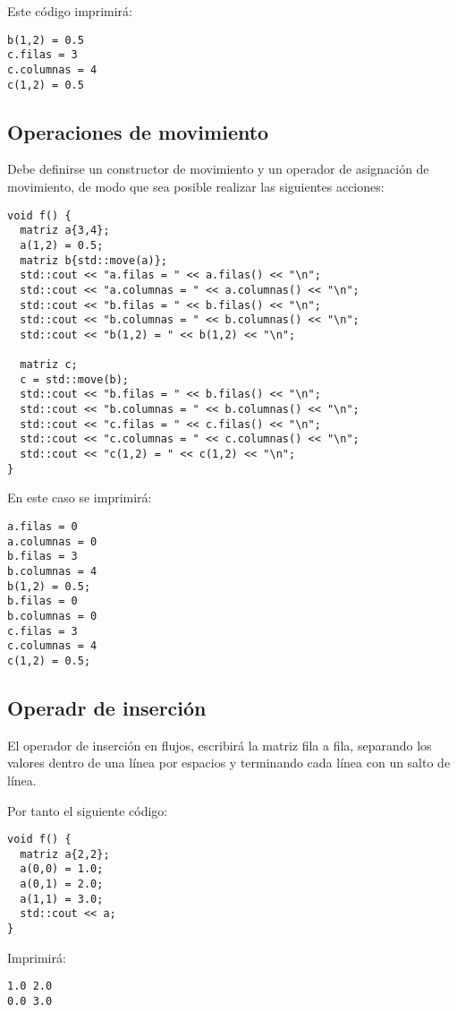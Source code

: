 Este código imprimirá:

\begin{lstlisting}[style=terminal]
b(1,2) = 0.5
c.filas = 3
c.columnas = 4
c(1,2) = 0.5
\end{lstlisting}

\subsection{Operaciones de movimiento}

Debe definirse un constructor de movimiento y un operador de asignación de
movimiento, de modo que sea posible realizar las siguientes acciones:

\begin{lstlisting}
void f() {
  matriz a{3,4};
  a(1,2) = 0.5;
  matriz b{std::move(a)};
  std::cout << "a.filas = " << a.filas() << "\n";
  std::cout << "a.columnas = " << a.columnas() << "\n";
  std::cout << "b.filas = " << b.filas() << "\n";
  std::cout << "b.columnas = " << b.columnas() << "\n";
  std::cout << "b(1,2) = " << b(1,2) << "\n";

  matriz c;
  c = std::move(b);
  std::cout << "b.filas = " << b.filas() << "\n";
  std::cout << "b.columnas = " << b.columnas() << "\n";
  std::cout << "c.filas = " << c.filas() << "\n";
  std::cout << "c.columnas = " << c.columnas() << "\n";
  std::cout << "c(1,2) = " << c(1,2) << "\n";
}
\end{lstlisting}

En este caso se imprimirá:

\begin{lstlisting}[style=terminal]
a.filas = 0
a.columnas = 0
b.filas = 3
b.columnas = 4
b(1,2) = 0.5;
b.filas = 0
b.columnas = 0
c.filas = 3
c.columnas = 4
c(1,2) = 0.5;
\end{lstlisting}

\subsection{Operadr de inserción}

El operador de inserción en flujos, escribirá la matriz fila a fila, separando
los valores dentro de una línea por espacios y terminando cada línea con un
salto de línea.

Por tanto el siguiente código:

\begin{lstlisting}
void f() {
  matriz a{2,2};
  a(0,0) = 1.0;
  a(0,1) = 2.0;
  a(1,1) = 3.0;
  std::cout << a;
}
\end{lstlisting}

Imprimirá:

\begin{lstlisting}[style=terminal]
1.0 2.0
0.0 3.0
\end{lstlisting}
